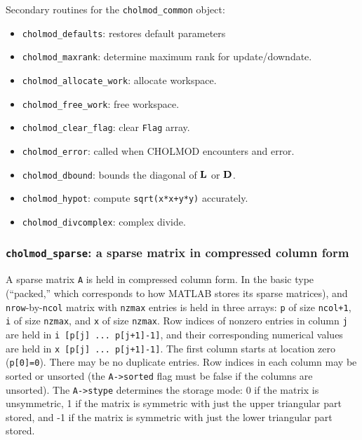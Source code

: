 \documentclass[11pt]{article}
\newcommand{\m}[1]{{\bf{#1}}}       %
\begin{document}
\noindent Secondary routines for the {\tt cholmod\_common} object:
    \begin{itemize}
    \item {\tt cholmod\_defaults}: restores default parameters
    \item {\tt cholmod\_maxrank}: determine maximum rank for update/downdate.
    \item {\tt cholmod\_allocate\_work}: allocate workspace.
    \item {\tt cholmod\_free\_work}: free workspace.
    \item {\tt cholmod\_clear\_flag}: clear {\tt Flag} array.
    \item {\tt cholmod\_error}: called when CHOLMOD encounters and error.
    \item {\tt cholmod\_dbound}: bounds the diagonal of $\m{L}$ or $\m{D}$.
    \item {\tt cholmod\_hypot}: compute {\tt sqrt(x*x+y*y)} accurately.
    \item {\tt cholmod\_divcomplex}: complex divide.
    \end{itemize}

\newpage \subsubsection{{\tt cholmod\_sparse}: a sparse matrix in compressed column form}
    A sparse matrix {\tt A} is held in compressed column form.  In the basic
    type (``packed,'' which corresponds to how MATLAB stores its sparse
    matrices), and {\tt nrow}-by-{\tt ncol} matrix with {\tt nzmax} entries
    is held in three arrays: {\tt p} of size {\tt ncol+1},
    {\tt i} of size {\tt nzmax}, and {\tt x} of size {\tt nzmax}.
    Row indices of nonzero entries in column {\tt j} are held in
    {\tt i [p[j] ... p[j+1]-1]}, and their corresponding numerical values
    are held in {\tt x [p[j] ... p[j+1]-1]}.  The first column starts at
    location zero ({\tt p[0]=0}).
    There may be no duplicate entries.  Row indices in each column may
    be sorted or unsorted (the {\tt A->sorted} flag must be false if
    the columns are unsorted).  The {\tt A->stype} determines the 
    storage mode: 0 if the matrix is unsymmetric, 1 if the matrix is
    symmetric with just the upper triangular part stored, and -1 if
    the matrix is symmetric with just the lower triangular part stored.
\end{document}
